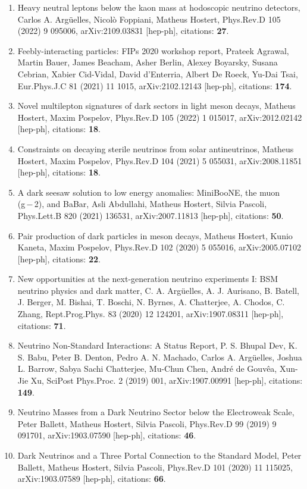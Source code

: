 \documentclass[a4paper,10pt]{article}
\begin{document}
\begin{enumerate}
\item Heavy neutral leptons below the kaon mass at hodoscopic neutrino detectors, Carlos A. Argüelles, Nicolò Foppiani, Matheus Hostert, Phys.Rev.D 105 (2022) 9 095006, arXiv:2109.03831 [hep-ph], citations: \textbf{27}.
\item Feebly-interacting particles: FIPs 2020 workshop report, Prateek Agrawal, Martin Bauer, James Beacham, Asher Berlin, Alexey Boyarsky, Susana Cebrian, Xabier Cid-Vidal, David d'Enterria, Albert De Roeck, Yu-Dai Tsai, Eur.Phys.J.C 81 (2021) 11 1015, arXiv:2102.12143 [hep-ph], citations: \textbf{174}.
\item Novel multilepton signatures of dark sectors in light meson decays, Matheus Hostert, Maxim Pospelov, Phys.Rev.D 105 (2022) 1 015017, arXiv:2012.02142 [hep-ph], citations: \textbf{18}.
\item Constraints on decaying sterile neutrinos from solar antineutrinos, Matheus Hostert, Maxim Pospelov, Phys.Rev.D 104 (2021) 5 055031, arXiv:2008.11851 [hep-ph], citations: \textbf{18}.
\item A dark seesaw solution to low energy anomalies: MiniBooNE, the muon (g − 2), and BaBar, Asli Abdullahi, Matheus Hostert, Silvia Pascoli, Phys.Lett.B 820 (2021) 136531, arXiv:2007.11813 [hep-ph], citations: \textbf{50}.
\item Pair production of dark particles in meson decays, Matheus Hostert, Kunio Kaneta, Maxim Pospelov, Phys.Rev.D 102 (2020) 5 055016, arXiv:2005.07102 [hep-ph], citations: \textbf{22}.
\item New opportunities at the next-generation neutrino experiments I: BSM neutrino physics and dark matter, C. A. Argüelles, A. J. Aurisano, B. Batell, J. Berger, M. Bishai, T. Boschi, N. Byrnes, A. Chatterjee, A. Chodos, C. Zhang, Rept.Prog.Phys. 83 (2020) 12 124201, arXiv:1907.08311 [hep-ph], citations: \textbf{71}.
\item Neutrino Non-Standard Interactions: A Status Report, P. S. Bhupal Dev, K. S. Babu, Peter B. Denton, Pedro A. N. Machado, Carlos A. Argüelles, Joshua L. Barrow, Sabya Sachi Chatterjee, Mu-Chun Chen, André de Gouvêa, Xun-Jie Xu, SciPost Phys.Proc. 2 (2019) 001, arXiv:1907.00991 [hep-ph], citations: \textbf{149}.
\item Neutrino Masses from a Dark Neutrino Sector below the Electroweak Scale, Peter Ballett, Matheus Hostert, Silvia Pascoli, Phys.Rev.D 99 (2019) 9 091701, arXiv:1903.07590 [hep-ph], citations: \textbf{46}.
\item Dark Neutrinos and a Three Portal Connection to the Standard Model, Peter Ballett, Matheus Hostert, Silvia Pascoli, Phys.Rev.D 101 (2020) 11 115025, arXiv:1903.07589 [hep-ph], citations: \textbf{66}.

\end{enumerate}
\end{document}
